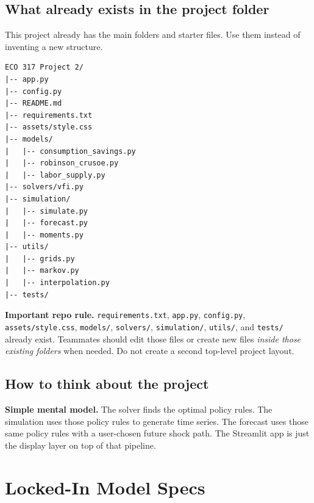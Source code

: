 \documentclass[11pt]{article}
\begin{document}
\subsection{What already exists in the project folder}
This project already has the main folders and starter files. Use them instead of inventing a new structure.

\begin{lstlisting}
ECO 317 Project 2/
|-- app.py
|-- config.py
|-- README.md
|-- requirements.txt
|-- assets/style.css
|-- models/
|   |-- consumption_savings.py
|   |-- robinson_crusoe.py
|   |-- labor_supply.py
|-- solvers/vfi.py
|-- simulation/
|   |-- simulate.py
|   |-- forecast.py
|   |-- moments.py
|-- utils/
|   |-- grids.py
|   |-- markov.py
|   |-- interpolation.py
|-- tests/
\end{lstlisting}

\begin{notebox}
\textbf{Important repo rule.} \texttt{requirements.txt}, \texttt{app.py}, \texttt{config.py}, \texttt{assets/style.css}, \texttt{models/}, \texttt{solvers/}, \texttt{simulation/}, \texttt{utils/}, and \texttt{tests/} already exist. Teammates should edit those files or create new files \emph{inside those existing folders} when needed. Do not create a second top-level project layout.
\end{notebox}

\subsection{How to think about the project}
\begin{intuitbox}
\textbf{Simple mental model.} The solver finds the optimal policy rules. The simulation uses those policy rules to generate time series. The forecast uses those same policy rules with a user-chosen future shock path. The Streamlit app is just the display layer on top of that pipeline.
\end{intuitbox}

\section{Locked-In Model Specs}
\end{document}
